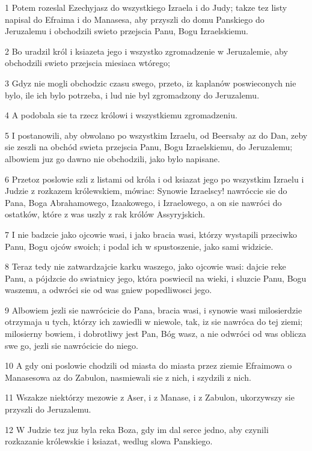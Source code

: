 \par 1 Potem rozeslal Ezechyjasz do wszystkiego Izraela i do Judy; takze tez listy napisal do Efraima i do Manasesa, aby przyszli do domu Panskiego do Jeruzalemu i obchodzili swieto przejscia Panu, Bogu Izraelskiemu.
\par 2 Bo uradzil król i ksiazeta jego i wszystko zgromadzenie w Jeruzalemie, aby obchodzili swieto przejscia miesiaca wtórego;
\par 3 Gdyz nie mogli obchodzic czasu swego, przeto, iz kaplanów poswieconych nie bylo, ile ich bylo potrzeba, i lud nie byl zgromadzony do Jeruzalemu.
\par 4 A podobala sie ta rzecz królowi i wszystkiemu zgromadzeniu.
\par 5 I postanowili, aby obwolano po wszystkim Izraelu, od Beersaby az do Dan, zeby sie zeszli na obchód swieta przejscia Panu, Bogu Izraelskiemu, do Jeruzalemu; albowiem juz go dawno nie obchodzili, jako bylo napisane.
\par 6 Przetoz poslowie szli z listami od króla i od ksiazat jego po wszystkim Izraelu i Judzie z rozkazem królewskiem, mówiac: Synowie Izraelscy! nawróccie sie do Pana, Boga Abrahamowego, Izaakowego, i Izraelowego, a on sie nawróci do ostatków, które z was uszly z rak królów Assyryjskich.
\par 7 I nie badzcie jako ojcowie wasi, i jako bracia wasi, którzy wystapili przeciwko Panu, Bogu ojców swoich; i podal ich w spustoszenie, jako sami widzicie.
\par 8 Teraz tedy nie zatwardzajcie karku waszego, jako ojcowie wasi: dajcie reke Panu, a pójdzcie do swiatnicy jego, która poswiecil na wieki, i sluzcie Panu, Bogu waszemu, a odwróci sie od was gniew popedliwosci jego.
\par 9 Albowiem jezli sie nawrócicie do Pana, bracia wasi, i synowie wasi milosierdzie otrzymaja u tych, którzy ich zawiedli w niewole, tak, iz sie nawróca do tej ziemi; milosierny bowiem, i dobrotliwy jest Pan, Bóg wasz, a nie odwróci od was oblicza swe go, jezli sie nawrócicie do niego.
\par 10 A gdy oni poslowie chodzili od miasta do miasta przez ziemie Efraimowa o Manasesowa az do Zabulon, nasmiewali sie z nich, i szydzili z nich.
\par 11 Wszakze niektórzy mezowie z Aser, i z Manase, i z Zabulon, ukorzywszy sie przyszli do Jeruzalemu.
\par 12 W Judzie tez juz byla reka Boza, gdy im dal serce jedno, aby czynili rozkazanie królewskie i ksiazat, wedlug slowa Panskiego.
